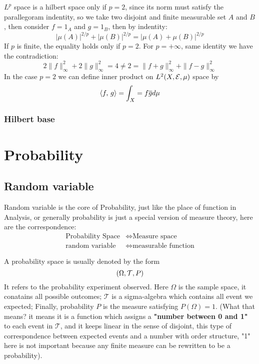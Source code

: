 \documentclass[en,geye,blue,normal,12pt,bibend=bibtex]{elegantnote}
\begin{document}
\begin{example}
    \(L^p\) space is a hilbert space only if \(p = 2\), since its norm must satisfy the parallegoram indentity, so we take two disjoint and finite measurable set \(A\) and \(B\), then consider \(f = 1_{A}\) and \(g = 1_{B}\), then by indentity:
    \[ |\mu(A)|^{2/p}+ |\mu(B)|^{2/p} = |\mu(A)+\mu(B)|^{2/p}\]
    If \(p\) is finite, the equality holds only if \(p =2\). For \(p = + \infty\), same identity we have the contradiction:
    \[2\|f\|_{\infty}^2  + 2\|g\|_{\infty}^2 = 4 \neq 2 = \|f+g\|_{\infty}^2 + \|f-g\|_{\infty}^2\]
    In the case \(p=2\) we can define inner product on \(L^2 (X,\mathcal{E}, \mu)\) space by
    \[\left\langle f,\, g \right\rangle = \int_X = f \overline{g} d\mu \]
\end{example}

\subsubsection{Hilbert base}

\newpage 

\section{Probability}

\subsection{Random variable}
Random variable is the core of Probability, just like the place of function in Analysis, or generally probability is just a special version of measure theory, here are the correspondence:
\begin{align*}
    \text{Probability Space} &\Longleftrightarrow \text{Measure space}\\
    \text{random variable} &\Longleftrightarrow \text{measurable function}
\end{align*}

A probability space is usually denoted by the form
\[(\Omega, \mathcal{T}, P)\]
It refers to the probability experiment observed. Here \(\Omega\) is the sample space, it conatains all possible outcomes; \(\mathcal{T}\) is a sigma-algebra which contains all event we expected; Finally, probability \(P\) is the measure satisfying \(P(\Omega)=1\). (What that means? it means it is a function which assigns a \textbf{"number between 0 and 1"} to each event in \(\mathcal{T}\), and it keeps linear in the sense of disjoint, this type of correspondence between expected events and a number with order structure, "1" here is not important because any finite measure can be rewritten to be a probability).
\end{document}
